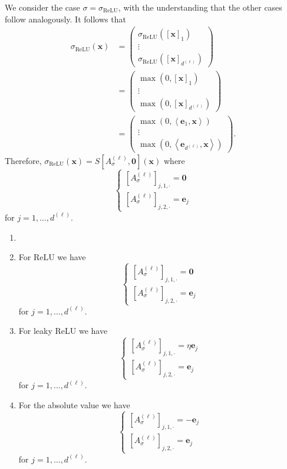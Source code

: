 \begin{tproof}
    We consider the case $\sigma=\sigma_{\text{ReLU}}$, with the understanding that the other cases follow analogously. It follows that
    \begin{align*}
        \sigma_{\text{ReLU}}(\mathbf{x})&=\begin{pmatrix}\sigma_{\text{ReLU}}\left(\left[\mathbf{x}\right]_1\right)\\\vdots\\\sigma_{\text{ReLU}}\left(\left[\mathbf{x}\right]_{d^{(\ell)}}\right)\end{pmatrix}\\&=\begin{pmatrix}\max\left(0,\left[\mathbf{x}\right]_1\right)\\\vdots\\\max\left(0,\left[\mathbf{x}\right]_{d^{(\ell)}}\right)\end{pmatrix}\\&=\begin{pmatrix}\max\left(0,\left\langle\mathbf{e}_1,\mathbf{x}\right\rangle\right)\\\vdots\\\max\left(0,\left\langle\mathbf{e}_{d^{(\ell)}},\mathbf{x}\right\rangle\right)\end{pmatrix}.
    \end{align*}
    Therefore, $\sigma_{\text{ReLU}}(\mathbf{x})=S\left[A^{(\ell)}_{\sigma},\mathbf{0}\right](\mathbf{x})$ where $$\begin{cases}\left[A_{\sigma}^{(\ell)}\right]_{j,1,\cdot}=\mathbf{0}\\\left[A_{\sigma}^{(\ell)}\right]_{j,2,\cdot}=\mathbf{e}_j\end{cases}$$for $j=1,\dots,d^{(\ell)}$.
\end{tproof}

\begin{example}\label{eg:maso_activation_operators}
    \begin{enumerate}
        \item[]
        \item For ReLU we have $$\begin{cases}\left[A_{\sigma}^{(\ell)}\right]_{j,1,\cdot}=\mathbf{0}\\\left[A_{\sigma}^{(\ell)}\right]_{j,2,\cdot}=\mathbf{e}_j\end{cases}$$for $j=1,\dots,d^{(\ell)}$.
        \item For leaky ReLU we have $$\begin{cases}\left[A_{\sigma}^{(\ell)}\right]_{j,1,\cdot}=\eta\mathbf{e}_j\\\left[A_{\sigma}^{(\ell)}\right]_{j,2,\cdot}=\mathbf{e}_j\end{cases}$$for $j=1,\dots,d^{(\ell)}$.
        \item For the absolute value we have $$\begin{cases}\left[A_{\sigma}^{(\ell)}\right]_{j,1,\cdot}=-\mathbf{e}_j\\\left[A_{\sigma}^{(\ell)}\right]_{j,2,\cdot}=\mathbf{e}_j\end{cases}$$for $j=1,\dots,d^{(\ell)}$.
    \end{enumerate}
\end{example}

